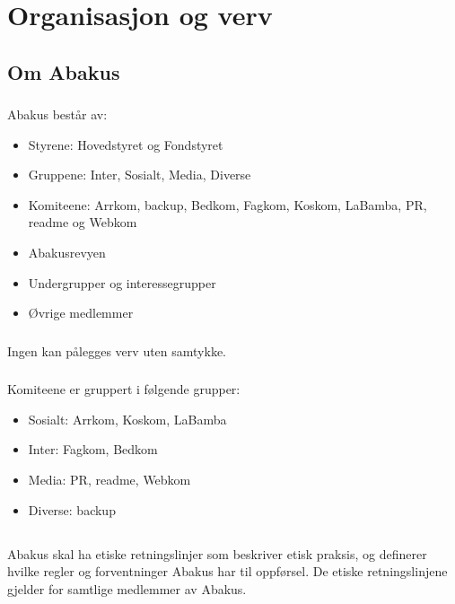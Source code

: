 \section{Organisasjon og verv}
\subsection{Om Abakus}

\subsubsection{}
Abakus består av:

\begin{itemize}
\item Styrene: Hovedstyret og Fondstyret
\item Gruppene: Inter, Sosialt, Media, Diverse
\item Komiteene: Arrkom, backup, Bedkom, Fagkom, Koskom, LaBamba, PR, readme og Webkom
\item Abakusrevyen
\item Undergrupper og interessegrupper
\item Øvrige medlemmer
\end{itemize}

\subsubsection{}
Ingen kan pålegges verv uten samtykke.

\subsubsection{}
Komiteene er gruppert i følgende grupper:

\begin{itemize}
\item Sosialt: Arrkom, Koskom, LaBamba
\item Inter: Fagkom, Bedkom
\item Media: PR, readme, Webkom
\item Diverse: backup
\end{itemize}

\subsection{}
Abakus skal ha etiske retningslinjer som beskriver etisk praksis, og definerer hvilke regler og
forventninger Abakus har til oppførsel. De etiske retningslinjene gjelder for samtlige medlemmer av
Abakus.

